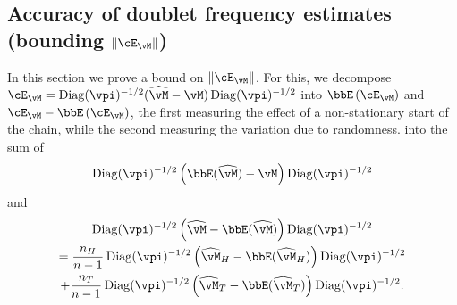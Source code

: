 \subsection{Accuracy of doublet frequency estimates (bounding $\norm{\errm}$)}
\label{sec:pairwise}
In this section we prove a bound on $\norm{\errm}$.
For this, we decompose
$\errm = \Diag(\vpi)^{-1/2}(\wh\vM-\vM)\Diag(\vpi)^{-1/2} $
into $\EE{\errm}$ and 
$
\errm-\EE{\errm}%
$, the first measuring the effect of a non-stationary start of the chain,
while the second measuring the variation due to randomness.
into the sum of
\[
  \Diag(\vpi)^{-1/2}
  \left(\bbE( \wh\vM )- \vM\right)
  \Diag(\vpi)^{-1/2}
\]
and
\begin{multline*}
  \Diag(\vpi)^{-1/2} \left(\wh\vM- \bbE(\wh\vM)\right) \Diag(\vpi)^{-1/2}
  \\
  =
  \frac{n_H}{n-1}
  \Diag(\vpi)^{-1/2}\Parens{
    \wh{\vM}_H - \bbE(\wh{\vM}_H)
  }\Diag(\vpi)^{-1/2}
  \\
  + \frac{n_T}{n-1}
  \Diag(\vpi)^{-1/2}\Parens{
    \wh{\vM}_T - \bbE(\wh{\vM}_T)
  }\Diag(\vpi)^{-1/2}
  .
\end{multline*}
\fi

